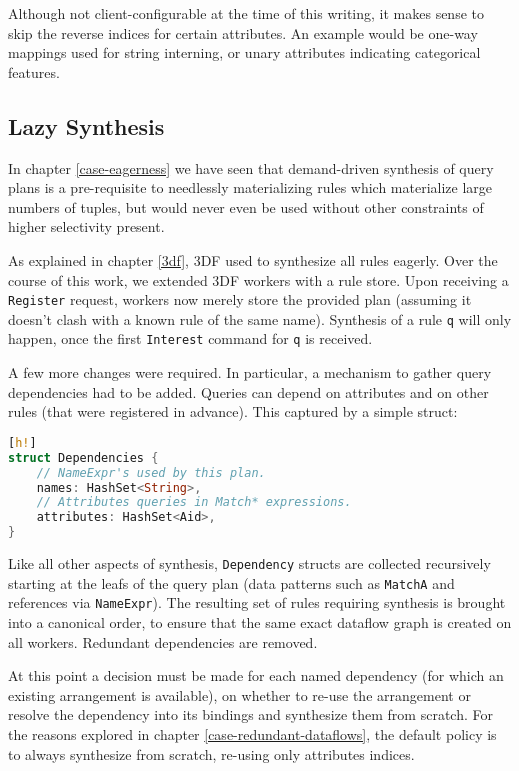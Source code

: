 \documentclass[../index.tex]{subfiles}
\begin{document}
Although not client-configurable at the time of this writing, it makes
sense to skip the reverse indices for certain attributes. An example
would be one-way mappings used for string interning, or unary
attributes indicating categorical features.

\subsection{Lazy Synthesis} \label{lazy-synthesis}

In chapter \ref{case-eagerness} we have seen that demand-driven
synthesis of query plans is a pre-requisite to needlessly
materializing rules which materialize large numbers of tuples, but
would never even be used without other constraints of higher
selectivity present.

As explained in chapter \ref{3df}, 3DF used to synthesize all rules
eagerly. Over the course of this work, we extended 3DF workers with a
rule store. Upon receiving a \texttt{Register} request, workers now
merely store the provided plan (assuming it doesn't clash with a known
rule of the same name). Synthesis of a rule \texttt{q} will only
happen, once the first \texttt{Interest} command for \texttt{q} is
received.

A few more changes were required. In particular, a mechanism to gather
query dependencies had to be added. Queries can depend on attributes
and on other rules (that were registered in advance). This captured by
a simple struct:

\begin{lstlisting}[language=Rust, style=colouredRust][h!]
struct Dependencies {
    // NameExpr's used by this plan.
    names: HashSet<String>,
    // Attributes queries in Match* expressions.
    attributes: HashSet<Aid>,
}
\end{lstlisting}

Like all other aspects of synthesis, \texttt{Dependency} structs are
collected recursively starting at the leafs of the query plan (data
patterns such as \texttt{MatchA} and references via
\texttt{NameExpr}). The resulting set of rules requiring synthesis is
brought into a canonical order, to ensure that the same exact dataflow
graph is created on all workers. Redundant dependencies are removed.

At this point a decision must be made for each named dependency (for
which an existing arrangement is available), on whether to re-use the
arrangement or resolve the dependency into its bindings and synthesize
them from scratch. For the reasons explored in chapter
\ref{case-redundant-dataflows}, the default policy is to always
synthesize from scratch, re-using only attributes indices.
\end{document}
